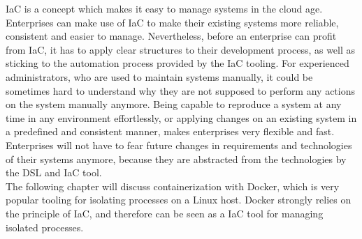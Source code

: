 IaC is a concept which makes it easy to manage systems in the cloud age. Enterprises can make use of IaC to make their existing systems more reliable, consistent and easier to manage. Nevertheless, before an enterprise can profit from IaC, it has to apply clear structures to their development process, as well as sticking to the automation process provided by the IaC tooling. For experienced administrators, who are used to maintain systems manually, it could be sometimes hard to understand why they are not supposed to perform any actions on the system manually anymore. Being capable to reproduce a system at any time in any environment effortlessly, or applying changes on an existing system in a predefined and consistent manner, makes enterprises very flexible and fast. Enterprises will not have to fear future changes in requirements and technologies of their systems anymore, because they are abstracted from the technologies by the DSL and IaC tool. \\

The following chapter will discuss containerization with Docker, which is very popular tooling for isolating processes on a Linux host. Docker strongly relies on the principle of IaC, and therefore can be seen as a IaC tool for managing isolated processes.    



